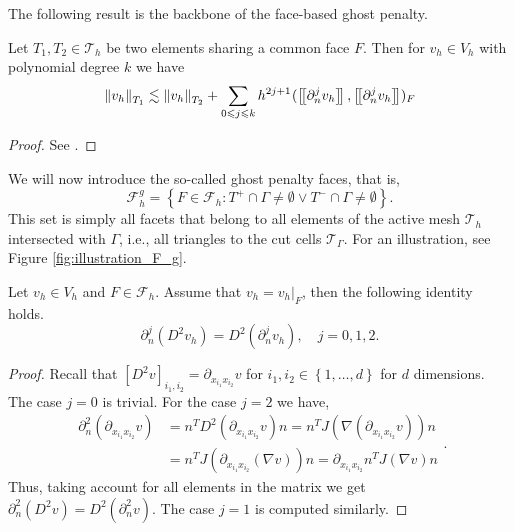 The following result is the backbone of the face-based ghost penalty.
\begin{lemma}
    \label{lemma:bi_local_facet_estimate}
    Let $T_{1},T_{2 } \in  \mathcal{T} _{h}$ be two elements sharing a common face $F$. Then for $v_{h} \in V_{h}$ with polynomial degree $k$  we have
    \begin{equation}
    \| v_{h} \|_{ T_{1} }^{  }  \lesssim \| v_{h} \|_{ T_{2} }^{  } + \sum_{0\leqslant j\leqslant k}  {h^{2j +1}}^{} ( \left[\!\left[  \partial _{n}^{j} v_{h}  \right]\!\right], \left[\!\left[  \partial ^{j}_{n} v_{h}  \right]\!\right]    )_{F}
    \end{equation}

\end{lemma}
\begin{proof}
    See \cite[Lemma 2.19]{gurkan2019stabilized}.
\end{proof}

We will now introduce the so-called ghost penalty faces, that is, \[
\mathcal{F} ^{g}_{h} = \left\{ F\in \mathcal{F} _{h} : T^{+}\cap \Gamma \neq \emptyset  \vee T^{-}\cap \Gamma \neq \emptyset  \right\}.
\]
This set is simply all facets that belong to all elements of the active mesh $\mathcal{T} _{h}$  intersected with $\Gamma $, i.e., all triangles to the cut cells $\mathcal{T} _{\Gamma }$. For an illustration, see Figure \ref{fig:illustration_F_g}.

\begin{proposition}
    \label{prop:hessian_change}
    Let $v_{h} \in V_{h} $ and $F \in  \mathcal{F} _{h}$. Assume that $ v_{h} = v_{h} |_{F}$,  then the following identity holds.
    \begin{equation}
    \partial ^{j}_{n} (D^2v_{h}) = D^2 ( \partial ^{j}_{n} v_{h}), \quad  j=0,1,2.
    \end{equation}
\end{proposition}

\begin{proof}

        Recall that $\left[ D^2 v \right]_{i_{1},i_{2}} = \partial _{x_{i_{1}}x_{i_{2}}} v $ for $i_{1}, i_{2} \in \left\{ 1,\ldots,d \right\} $ for $d$ dimensions. The case $j=0$ is trivial. For the case $j=2$ we have,
        \begin{equation}
                \begin{split}
                \partial^{2} _{n} (\partial _{x_{i_{1}} x_{i_{2}}} v) & = n^{T}  D^2(\partial _{x_{i_{1}} x_{i_{2}}} v) n = n^{T}  J( \nabla (\partial _{x_{i_{1}} x_{i_{2}}}v) ) n \\
                & =  n^{T}  J(\partial _{x_{i_{1}} x_{i_{2}}}(\nabla v) ) n = \partial _{x_{i_{1}} x_{i_{2}}} n^{T} J(\nabla v) n
                \end{split}.
        \end{equation}
            Thus, taking account for all elements in the matrix we get $\partial^{2} _{n} (D^2v) = D^2( \partial^{2} _{n}v)$. The case $j=1$ is computed similarly.

\end{proof}

